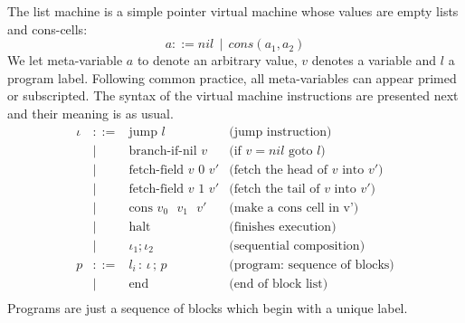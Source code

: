 \documentclass[sigconf]{acmart}
\theoremstyle{definition}
\begin{document}
The list machine is a simple pointer virtual machine whose values
are empty lists and cons-cells:
\[
a ::= nil\,\mid\,cons(a_1,a_2)
\]
We let meta-variable $a$ to denote an arbitrary value, $v$ denotes a variable
and $l$ a program label. Following common practice, all meta-variables can
appear primed or subscripted. The syntax of the virtual machine instructions are
presented next and their meaning is as usual.
\[
\begin{array}{rcll}
  \iota & ::=  & \text{jump }l                       & \text{(jump instruction)}\\
        & \mid & \text{branch-if-nil $v$}            & \text{(if $v = nil$ goto $l$)}\\
        & \mid & \text{fetch-field $v$ 0 $v'$}       & \text{(fetch the head of $v$ into $v'$)}\\
        & \mid & \text{fetch-field  $v$ 1 $v'$}      & \text{(fetch the tail of $v$ into $v'$)}\\
        & \mid & \text{cons $v_0$ $v_1$ $v'$}        & \text{(make a cons cell in v')} \\
        & \mid & \text{halt}                         & \text{(finishes execution)}\\
        & \mid & \iota_1;\iota_2                             & \text{(sequential composition)}\\
      p & ::=  & l_i \,:\,\iota\,;\,p                    & \text{(program: sequence of blocks)}\\
        & \mid & \text{end}                          & \text{(end of block list)}\\
\end{array}
\]
Programs are just a sequence of blocks which begin with a unique label. 
\end{document}
